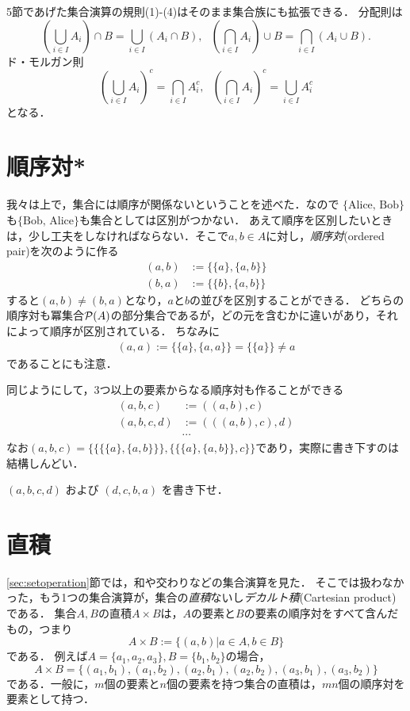 \documentclass[11pt,a4paper]{jsarticle}
\begin{document}
5節であげた集合演算の規則(1)-(4)はそのまま集合族にも拡張できる．
分配則は
\[
 \left( \bigcup_{i \in I} A_i \right) \cap B = \bigcup_{i \in I} \left( A_i  \cap B \right) , \ \ \ 
 \left( \bigcap_{i \in I} A_i \right) \cup B = \bigcap_{i \in I} \left( A_i  \cup B \right). 
\]
ド・モルガン則
\[
 \left( \bigcup_{i \in I} A_i \right)^c = \bigcap_{i \in I} A_i^c, \ \ \ 
 \left( \bigcap_{i \in I} A_i \right)^c = \bigcup_{i \in I} A_i^c
\]
となる．





\section{順序対*}
我々は上で，集合には順序が関係ないということを述べた．なので $\{\text{Alice, Bob}\}$も$\{\text{Bob, Alice}\}$も集合としては区別がつかない．
あえて順序を区別したいときは，少し工夫をしなければならない．そこで$a, b \in A$に対し，\emph{順序対}(ordered pair)を次のように作る
\begin{align*}
 (a, b) &:= \{ \{a\}, \{a, b\} \} \\
 (b, a) &:= \{ \{b\}, \{a, b\} \} 
\end{align*}
すると$(a,b) \neq (b,a)$となり，$a$と$b$の並びを区別することができる．
どちらの順序対も冪集合$\mathcal{P}(A)$の部分集合であるが，どの元を含むかに違いがあり，それによって順序が区別されている．
ちなみに
\begin{align*}
 (a, a) := \{ \{a\}, \{a, a\} \} = \{ \{a\} \} \neq a 
\end{align*}
であることにも注意．

同じようにして，3つ以上の要素からなる順序対も作ることができる
\begin{align*}
 (a, b, c) &:= ((a,b), c) \\
 (a, b, c, d) &:= (((a,b), c), d) \\
&\cdots
\end{align*}
なお$ (a, b, c) = \{\{\{\{a\}, \{a,b\}\}\}, \{\{\{a\}, \{a,b\}\}, c\}\}$であり，実際に書き下すのは結構しんどい．

\begin{exercise}
$(a,b,c,d)$ および $(d,c,b,a)$ を書き下せ．
\end{exercise} 

 
\section{直積}
\ref{sec:setoperation}節では，和や交わりなどの集合演算を見た．
そこでは扱わなかった，もう1つの集合演算が，集合の\emph{直積}ないし\emph{デカルト積}(Cartesian product)である．
集合$A, B$の直積$A \times B$は，$A$の要素と$B$の要素の順序対をすべて含んだもの，つまり
\[
 A \times B := \{ (a, b) | a \in A, b \in B\}
\]
である．
例えば$A = \{a_1, a_2, a_3\}, B = \{b_1, b_2\}$の場合，
\[
A \times B = \{(a_1, b_1), (a_1, b_2), (a_2, b_1), (a_2, b_2), (a_3, b_1), (a_3, b_2)\}
\]
である．一般に，$m$個の要素と$n$個の要素を持つ集合の直積は，$mn$個の順序対を要素として持つ．
\end{document}
